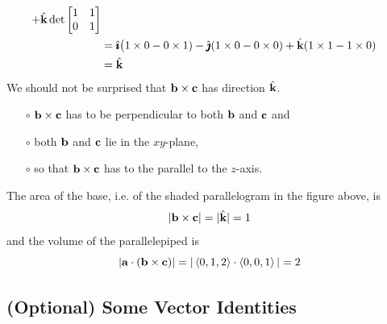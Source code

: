 \begin{eg}
\begin{align*}
   +\hat{\mathbf{k}}\det\left[\begin{matrix} 1&1\\ 
                                0&1\end{matrix}\right] \\
&=\hat{\pmb{\imath}}\big(1\times 0-0\times 1) -\hat{\pmb{\jmath}}(1\times 0-0\times 0) 
                  +\hat{\mathbf{k}}(1\times 1-1\times 0) \\
&=\hat{\mathbf{k}}
\end{align*}
We should not be surprised that $\mathbf{b}\times\mathbf{c}$ has direction $\hat{\mathbf{k}}$.
\begin{itemize}\itemsep1pt \parskip0pt 
\item[$\circ$]
$\mathbf{b}\times\mathbf{c}$ has to be perpendicular to both $\mathbf{b}$ and $\mathbf{c}$ and 
\item[$\circ$]
both $\mathbf{b}$ and $\mathbf{c}$ lie in the $xy$-plane, 
\item[$\circ$]
so that $\mathbf{b}\times\mathbf{c}$ has to the parallel to the $z$-axis.
\end{itemize}
The area of the base, i.e. of the shaded parallelogram in the figure above,
is
\begin{equation*}
|\mathbf{b}\times\mathbf{c}| = |\hat{\mathbf{k}}| =1
\end{equation*}
and the volume of the parallelepiped is
\begin{equation*}
|\mathbf{a}\cdot (\mathbf{b}\times\mathbf{c})|
= |\left< 0,1,2\right>\cdot\left< 0,0,1\right>|=2
\end{equation*}

\end{eg}

\subsection{(Optional) Some Vector Identities}
\label{sec vector identities}

